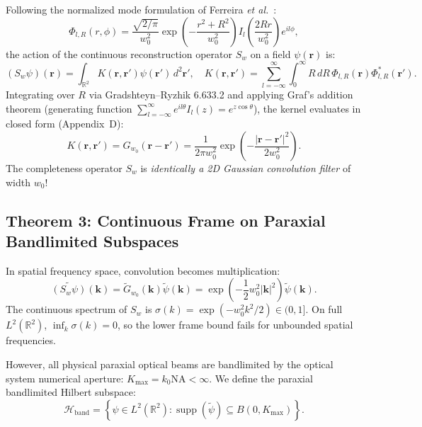 \documentclass{optica-article}
\begin{document}
Following the normalized mode formulation of Ferreira \emph{et al.}~\cite{Ferreira2026}:
\begin{equation}
\Phi_{l, R}(r, \phi) = \frac{\sqrt{2/\pi}}{w_0^2} \exp\left( - \frac{r^2 + R^2}{w_0^2} \right) I_l\left( \frac{2 R r}{w_0^2} \right) e^{i l \phi},
\end{equation}
the action of the continuous reconstruction operator $S_w$ on a field $\psi(\mathbf{r})$ is:
\begin{equation}
(S_w \psi)(\mathbf{r}) = \int_{\mathbb{R}^2} K(\mathbf{r}, \mathbf{r}') \psi(\mathbf{r}') \, d^2\mathbf{r}', \quad K(\mathbf{r}, \mathbf{r}') = \sum_{l=-\infty}^\infty \int_0^\infty R \, dR \, \Phi_{l, R}(\mathbf{r}) \Phi_{l, R}^*(\mathbf{r}').
\end{equation}
Integrating over $R$ via Gradshteyn--Ryzhik 6.633.2 and applying Graf's addition theorem (generating function $\sum_{l=-\infty}^\infty e^{i l \theta} I_l(z) = e^{z \cos \theta}$), the kernel evaluates in closed form (Appendix~D):
\begin{equation}
\boxed{K(\mathbf{r}, \mathbf{r}') = G_{w_0}(\mathbf{r} - \mathbf{r}') = \frac{1}{2\pi w_0^2} \exp\left( - \frac{|\mathbf{r} - \mathbf{r}'|^2}{2 w_0^2} \right).}
\label{eq:gaussian_kernel}
\end{equation}
The completeness operator $S_w$ is \emph{identically a 2D Gaussian convolution filter} of width $w_0$!

\subsection{Theorem 3: Continuous Frame on Paraxial Bandlimited Subspaces}

In spatial frequency space, convolution becomes multiplication:
\begin{equation}
\widetilde{(S_w \psi)}(\mathbf{k}) = \widetilde{G}_{w_0}(\mathbf{k}) \widetilde{\psi}(\mathbf{k}) = \exp\left( - \frac{1}{2} w_0^2 |\mathbf{k}|^2 \right) \widetilde{\psi}(\mathbf{k}).
\end{equation}
The continuous spectrum of $S_w$ is $\sigma(k) = \exp(-w_0^2 k^2 / 2) \in (0, 1]$. On full $L^2(\mathbb{R}^2)$, $\inf_{k} \sigma(k) = 0$, so the lower frame bound fails for unbounded spatial frequencies.

However, all physical paraxial optical beams are bandlimited by the optical system numerical aperture: $K_{\max} = k_0 \text{NA} < \infty$. We define the paraxial bandlimited Hilbert subspace:
\begin{equation}
\mathcal{H}_{\text{band}} = \left\{ \psi \in L^2(\mathbb{R}^2) : \operatorname{supp}(\widetilde{\psi}) \subseteq B(0, K_{\max}) \right\}.
\end{equation}
\end{document}
